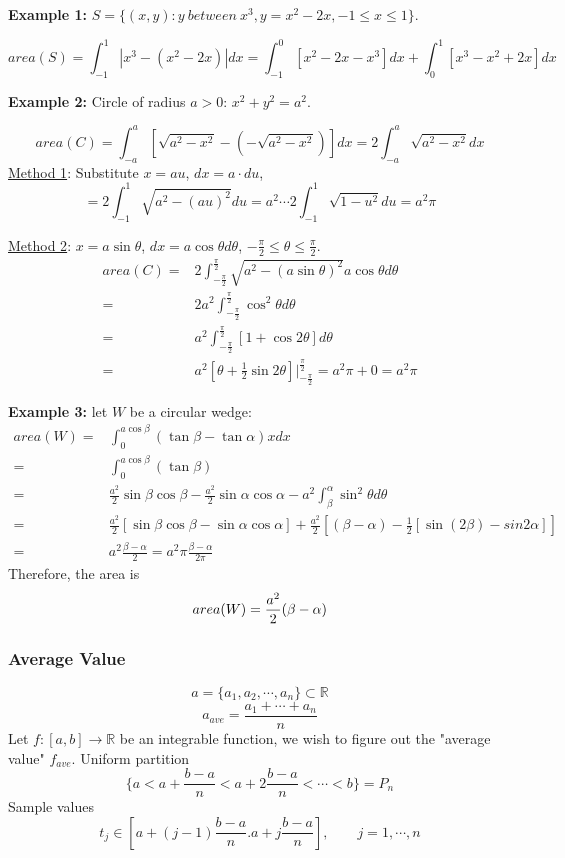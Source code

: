 \documentclass[12pt]{article}
\theoremstyle{plain}
\newcommand{\abs}[1]{\left| #1 \right|}
\newcommand{\mR}{{\mathbb{R}}}
\begin{document}
{\color{Brown}
\textbf{Example 1: }
$S = \{(x,y): y \ between \ x^3, y = x^2 - 2x, -1 \leq x \leq 1\}$. 

\[
	area (S) = \int_{-1}^1 \abs{x^3 - (x^2-2x)}dx 
	 = \int_{-1}^0 [x^2-2x-x^3]dx + \int_0^1 [x^3-x^2+2x]dx
\]


\textbf{Example 2: }
Circle of radius $a> 0$: $x^2+y^2 = a^2$. 

\[
	area(C) = \int_{-a}^a [\sqrt{a^2-x^2} - (-\sqrt{a^2-x^2})]dx
	 = 2\int_{-a}^a \sqrt{a^2-x^2}dx
\]
\underline{Method 1}: Substitute $x = au$, $dx=a\cdot du$, 
\[
	= 2\int_{-1}^1 \sqrt{a^2-(au)^2}du 
	= a^2 \cdots 2\int_{-1}^1\sqrt{1-u^2}du = a^2 \pi
\]

\underline{Method 2}: $x = a\sin \theta$, $dx = a\cos \theta d\theta$, 
$-\frac{\pi}2 \leq \theta \leq \frac{\pi}2$.
\begin{align*}
	area(C) 
	=& 2\int_{-\frac{\pi}2}^{\frac{\pi}2} 
	\sqrt{a^2-(a\sin \theta)^2} a\cos\theta d\theta\\
	=& 2a^2 \int_{-\frac{\pi}2}^{\frac{\pi}2} \cos^2\theta d\theta\\
	=& a^2 \int_{-\frac{\pi}2}^{\frac{\pi}2} [1+\cos2\theta] d\theta\\
	=& a^2 [\theta+\frac12 \sin 2\theta]
	\bigg\vert_{-\frac{\pi}2}^{\frac{\pi}2}
	= a^2\pi + 0 = a^2\pi
\end{align*}

\textbf{Example 3: }
let $W$ be a circular wedge: 
\begin{align*}
	area (W) 
	=& \int_0^{a\cos \beta} (\tan\beta -\tan \alpha) xdx\\
	=& \int_0^{a\cos \beta} (\tan \beta) \\
	=& \frac{a^2}2 \sin \beta \cos \beta - \frac{a^2}2 \sin \alpha \cos \alpha
	- a^2 \int_{\beta}^{\alpha} \sin^2 \theta d\theta\\
	=& \frac{a^2}2 [\sin\beta \cos \beta - \sin \alpha \cos \alpha]
	+ \frac{a^2}2 \left[(\beta - \alpha) - \frac 12 [\sin (2\beta) - 
	sin 2\alpha]  \right]\\
	=& a^2 \frac{\beta - \alpha}2 = a^2 \pi \frac{\beta - \alpha }{2\pi}
\end{align*}
Therefore, the area is 
\[
	area(W) = \frac{a^2}2 (\beta - \alpha)\\
\]
}

\subsubsection{Average Value}
\[
	a = \{a_1, a_2, \cdots, a_n\} \subset \mR 
\]
\[
	a_{ave} = \frac{a_1 + \cdots + a_n}n 
\]
Let $f:[a,b]\to\mR$ be an integrable function, we wish to figure out 
the "average value" $f_{ave}$. Uniform partition 
\[
	\{a < a+\frac{b-a}n < a + 2\frac{b-a}n < \cdots < b\} = P_n
\]
Sample values
\[
	t_j \in [a+(j-1)\frac{b-a}n . a+j\frac{b-a}n], \qquad j = 1, \cdots, n
\]
\end{document}
